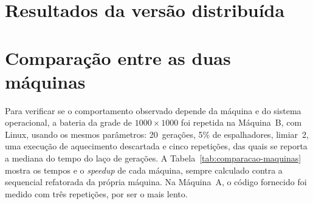 
\section{Resultados da versão distribuída}


\section{Comparação entre as duas máquinas}\label{sec:comparacao-maquinas}

Para verificar se o comportamento observado depende da máquina e do sistema operacional, a bateria da grade de $1000 \times 1000$ foi repetida na Máquina~B, com Linux, usando os mesmos parâmetros: 20~gerações, 5\% de espalhadores, limiar~2, uma execução de aquecimento descartada e cinco repetições, das quais se reporta a mediana do tempo do laço de gerações. A Tabela~\ref{tab:comparacao-maquinas} mostra os tempos e o \textit{speedup} de cada máquina, sempre calculado contra a sequencial refatorada da própria máquina. Na Máquina~A, o código fornecido foi medido com três repetições, por ser o mais lento.

